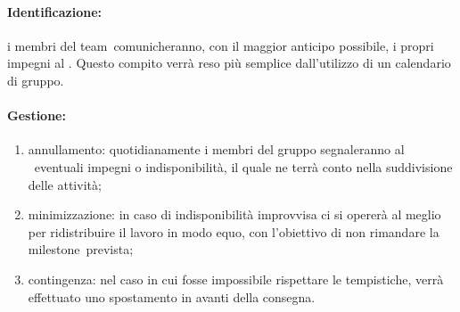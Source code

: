 \documentclass[../PianoProgetto.tex]{subfiles}
\begin{document}
	\paragraph*{Identificazione:} i membri del team\g\ comunicheranno, con il maggior anticipo possibile, i propri impegni al \responsabilediprogetto . Questo compito verrà reso più semplice dall'utilizzo di un calendario di gruppo. 
	
	\paragraph*{Gestione:}
	\begin{enumerate}
		\item annullamento: quotidianamente i membri del gruppo segnaleranno al \responsabilediprogetto\ eventuali impegni o indisponibilità, il quale ne terrà conto nella suddivisione delle attività;
		\item minimizzazione: in caso di indisponibilità improvvisa ci si opererà al meglio per ridistribuire il lavoro in modo equo, con l'obiettivo di non rimandare la milestone\g\ prevista;
		\item contingenza: nel caso in cui fosse impossibile rispettare le tempistiche, verrà effettuato uno spostamento in avanti della consegna.
	\end{enumerate}
		
		
\end{document}
